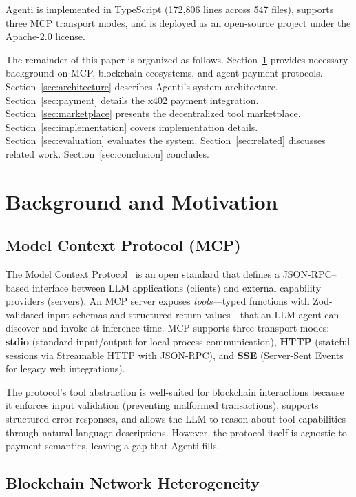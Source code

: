 \documentclass[11pt]{article}
\begin{document}
Agenti is implemented in TypeScript (172,806 lines across 547 files), supports three MCP transport modes, and is deployed as an open-source project under the Apache-2.0 license.

The remainder of this paper is organized as follows. Section~\ref{sec:background} provides necessary background on MCP, blockchain ecosystems, and agent payment protocols. Section~\ref{sec:architecture} describes Agenti's system architecture. Section~\ref{sec:payment} details the x402 payment integration. Section~\ref{sec:marketplace} presents the decentralized tool marketplace. Section~\ref{sec:implementation} covers implementation details. Section~\ref{sec:evaluation} evaluates the system. Section~\ref{sec:related} discusses related work. Section~\ref{sec:conclusion} concludes.

\section{Background and Motivation}
\label{sec:background}

\subsection{Model Context Protocol (MCP)}

The Model Context Protocol~\cite{anthropic2024mcp} is an open standard that defines a JSON-RPC--based interface between LLM applications (clients) and external capability providers (servers). An MCP server exposes \emph{tools}---typed functions with Zod-validated input schemas and structured return values---that an LLM agent can discover and invoke at inference time. MCP supports three transport modes: \textbf{stdio} (standard input/output for local process communication), \textbf{HTTP} (stateful sessions via Streamable HTTP with JSON-RPC), and \textbf{SSE} (Server-Sent Events for legacy web integrations).

The protocol's tool abstraction is well-suited for blockchain interactions because it enforces input validation (preventing malformed transactions), supports structured error responses, and allows the LLM to reason about tool capabilities through natural-language descriptions. However, the protocol itself is agnostic to payment semantics, leaving a gap that Agenti fills.

\subsection{Blockchain Network Heterogeneity}
\end{document}

